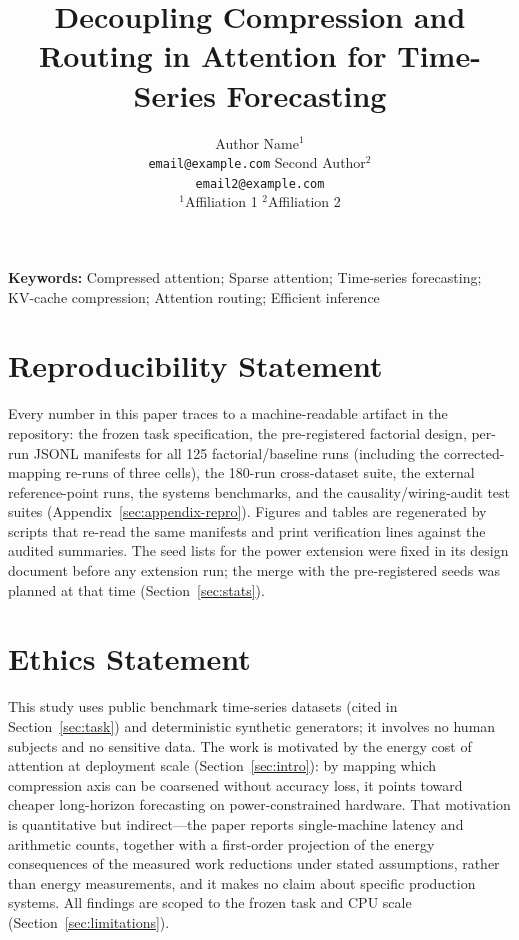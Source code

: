 \documentclass{article}
\title{Decoupling Compression and Routing in Attention for Time-Series Forecasting}
\author{%
  Author Name$^1$ \\ \texttt{email@example.com}
  \And
  Second Author$^2$ \\ \texttt{email2@example.com} \\
  $^1$Affiliation 1 \quad $^2$Affiliation 2
}
\begin{document}
\maketitle



\vspace{0.6em}
\noindent\textbf{Keywords:} Compressed attention; Sparse attention; Time-series forecasting; KV-cache compression; Attention routing; Efficient inference








\section*{Reproducibility Statement}
Every number in this paper traces to a machine-readable artifact in the
repository: the frozen task specification, the pre-registered factorial
design, per-run JSONL manifests for all 125 factorial/baseline runs (including the
corrected-mapping re-runs of three cells), the
180-run cross-dataset suite, the external reference-point runs, the systems
benchmarks, and the causality/wiring-audit test suites
(Appendix~\ref{sec:appendix-repro}). Figures and tables are regenerated by
scripts that re-read the same manifests and print verification lines
against the audited summaries. The seed lists for the power extension were
fixed in its design document before any extension run; the merge with the
pre-registered seeds was planned at that time
(Section~\ref{sec:stats}).

\section*{Ethics Statement}
This study uses public benchmark time-series datasets (cited in
Section~\ref{sec:task}) and deterministic synthetic generators; it involves
no human subjects and no sensitive data. The work is motivated by the
energy cost of attention at deployment scale (Section~\ref{sec:intro}):
by mapping which compression axis can be coarsened without accuracy loss,
it points toward cheaper long-horizon forecasting on power-constrained
hardware. That motivation is quantitative but indirect---the paper reports
single-machine latency and arithmetic counts, together with a first-order
projection of the energy consequences of the measured work reductions
under stated assumptions, rather than energy measurements, and it makes
no claim about specific production systems. All findings are scoped to the
frozen task and CPU scale (Section~\ref{sec:limitations}).
\end{document}
